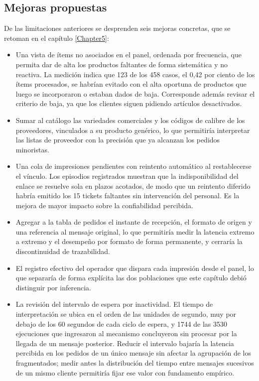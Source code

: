 \subsection{Mejoras propuestas}
\label{subsec:mejoras_ensayos}

De las limitaciones anteriores se desprenden seis mejoras concretas, que se retoman en el capítulo \ref{Chapter5}:

\begin{itemize}
    \item Una vista de ítems no asociados en el panel, ordenada por frecuencia, que permita dar de alta los productos faltantes de forma sistemática y no reactiva. La medición indica que 123 de los 458 casos, el 0,42 por ciento de los ítems procesados, se habrían evitado con el alta oportuna de productos que luego se incorporaron o estaban dados de baja. Corresponde además revisar el criterio de baja, ya que los clientes siguen pidiendo artículos desactivados.
    \item Sumar al catálogo las variedades comerciales y los códigos de calibre de los proveedores, vinculados a su producto genérico, lo que permitiría interpretar las listas de proveedor con la precisión que ya alcanzan los pedidos minoristas.
    \item Una cola de impresiones pendientes con reintento automático al restablecerse el vínculo. Los episodios registrados muestran que la indisponibilidad del enlace se resuelve sola en plazos acotados, de modo que un reintento diferido habría emitido los 15 tickets faltantes sin intervención del personal. Es la mejora de mayor impacto sobre la confiabilidad percibida.
    \item Agregar a la tabla de pedidos el instante de recepción, el formato de origen y una referencia al mensaje original, lo que permitiría medir la latencia extremo a extremo y el desempeño por formato de forma permanente, y cerraría la discontinuidad de trazabilidad.
    \item El registro efectivo del operador que dispara cada impresión desde el panel, lo que separaría de forma explícita las dos poblaciones que este capítulo debió distinguir por inferencia.
    \item La revisión del intervalo de espera por inactividad. El tiempo de interpretación se ubica en el orden de las unidades de segundo, muy por debajo de los 60 segundos de cada ciclo de espera, y 1744 de las 3530 ejecuciones que ingresaron al mecanismo concluyeron sin procesar por la llegada de un mensaje posterior. Reducir el intervalo bajaría la latencia percibida en los pedidos de un único mensaje sin afectar la agrupación de los fragmentados; medir antes la distribución del tiempo entre mensajes sucesivos de un mismo cliente permitiría fijar ese valor con fundamento empírico.
\end{itemize}
